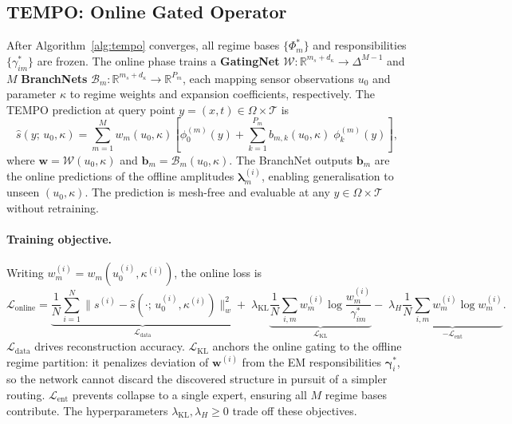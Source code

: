 \documentclass{article}
\begin{document}
\subsection{TEMPO: Online Gated Operator}\label{sec:online}


After Algorithm~\ref{alg:tempo} converges, all regime bases
$\{\Phi_m^*\}$ and responsibilities $\{\gamma_{im}^*\}$ are frozen.
The online phase trains a \textbf{GatingNet}
$\mathcal{W}: \mathbb{R}^{m_s + d_\kappa} \to \Delta^{M-1}$
and $M$ \textbf{BranchNets}
$\mathcal{B}_m: \mathbb{R}^{m_s + d_\kappa} \to \mathbb{R}^{P_m}$,
each mapping sensor observations $u_0$ and parameter
$\kappa$ to regime weights and expansion coefficients, respectively.
The TEMPO prediction at query point $y = (x,t) \in \Omega\times\mathcal{T}$ is
\begin{equation}
  \hat{s}(y;\,u_0,\kappa)
  = \sum_{m=1}^{M} w_m(u_0,\kappa)
    \left[
      \phi_0^{(m)}\!(y)
      + \sum_{k=1}^{P_m}
        b_{m,k}(u_0,\kappa)\;
        \phi_k^{(m)}\!(y)
    \right],
  \label{eq:predict}
\end{equation}
where $\mathbf{w} = \mathcal{W}(u_0,\kappa)$ and
$\mathbf{b}_m = \mathcal{B}_m(u_0,\kappa)$.
The BranchNet outputs $\mathbf{b}_m$ are the online predictions of the offline
amplitudes $\boldsymbol{\lambda}_m^{(i)}$, enabling generalisation to unseen
$(u_0,\kappa)$.
The prediction is mesh-free and evaluable at any $y\in\Omega\times\mathcal{T}$
without retraining.

\paragraph{Training objective.}
Writing $w_m^{(i)} = w_m(u_0^{(i)},\kappa^{(i)})$, the online loss is
\begin{equation}
  \mathcal{L}_{\mathrm{online}}
  = \underbrace{
      \frac{1}{N}\sum_{i=1}^{N}
      \|s^{(i)} - \hat{s}(\cdot;\,u_0^{(i)},\kappa^{(i)})\|_w^2
    }_{\mathcal{L}_{\mathrm{data}}}
  +\;\lambda_{\mathrm{KL}}
    \underbrace{
      \frac{1}{N}\sum_{i,m}
      w_m^{(i)}\log\frac{w_m^{(i)}}{\gamma_{im}^*}
    }_{\mathcal{L}_{\mathrm{KL}}}
  -\;\lambda_{H}
    \underbrace{
      \frac{1}{N}\sum_{i,m}
      w_m^{(i)}\log w_m^{(i)}
    }_{-\mathcal{L}_{\mathrm{ent}}}.
  \label{eq:online_loss}
\end{equation}
$\mathcal{L}_{\mathrm{data}}$ drives reconstruction accuracy.
$\mathcal{L}_{\mathrm{KL}}$ anchors the online gating to the
offline regime partition: it penalizes deviation of $\mathbf{w}^{(i)}$
from the EM responsibilities $\boldsymbol{\gamma}_i^*$, so the
network cannot discard the discovered structure in pursuit of a
simpler routing.
$\mathcal{L}_{\mathrm{ent}}$ prevents collapse to a single expert,
ensuring all $M$ regime bases contribute.
The hyperparameters $\lambda_{\mathrm{KL}}, \lambda_H \ge 0$ trade
off these objectives.
\end{document}
